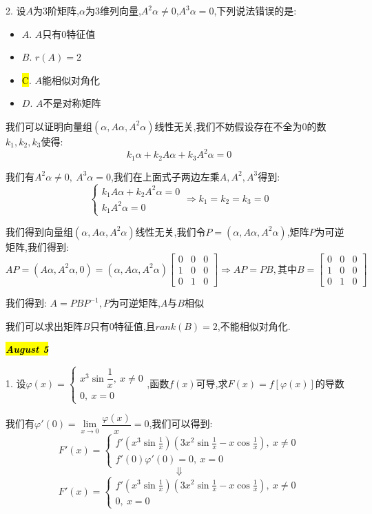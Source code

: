 2. 设$A$为$3$阶矩阵,$\alpha$为$3$维列向量,$A^2\alpha\neq 0$,$A^3\alpha=0$,下列说法错误的是:  
\begin{itemize}
	\item $A$. $A$只有$0$特征值
	\item $B$. $r(A)=2$
	\item \hl{C}. $A$能相似对角化
	\item $D$. $A$不是对称矩阵
\end{itemize}
\begin{solution}

	我们可以证明向量组$(\alpha,A\alpha,A^2\alpha)$线性无关,我们不妨假设存在不全为$0$的数$k_{1},k_{2},k_{3}$使得:  
	$$k_{1}\alpha+k_{2}A\alpha+k_{3}A^2\alpha=0$$
	
	我们有$A^2\alpha\neq 0,\ A^3\alpha=0$,我们在上面式子两边左乘$A,A^2,A^3$得到:  
	$$\left\lbrace
	\begin{array}{l}
		k_{1}A\alpha+k_{2}A^2\alpha=0\\
		k_{1}A^2\alpha=0
	\end{array}
	\right. \Rightarrow k_{1}=k_{2}=k_{3}=0$$
	
	我们得到向量组$(\alpha,A\alpha,A^2\alpha)$线性无关,我们令$P=(\alpha,A\alpha,A^2\alpha)$,矩阵$P$为可逆矩阵,我们得到:  
	$$AP=(A\alpha,A^2\alpha,0)=(\alpha,A\alpha,A^2\alpha)\left[ \begin{matrix}
		0&0&0\\1&0&0\\0&1&0
	\end{matrix}\right] \Rightarrow AP=PB,\text{其中}B=\left[ \begin{matrix}
	0&0&0\\1&0&0\\0&1&0
\end{matrix}\right] $$

我们得到:  $A=PBP^{-1},P\text{为可逆矩阵}$,$A$与$B$相似

我们可以求出矩阵$B$只有$0$特征值,且$rank(B)=2$,不能相似对角化.
\end{solution}

\hl{\textbf{\textit{August 5}}}

1. 设$\varphi(x)=\left\lbrace
\begin{array}{l}
	x^3\sin\dfrac{1}{x},\ x\neq 0\\
	0,\ x=0
\end{array}
\right. $,函数$f(x)$可导,求$F(x)=f[\varphi(x)]$的导数
\begin{solution}

	我们有$\varphi'(0)=\lim\limits_{x\rightarrow 0}\dfrac{\varphi(x)}{x}=0$,我们可以得到:  
	$$F'(x)=\left\lbrace
	\begin{array}{l}
		f'(x^3\sin\frac{1}{x})(3x^2\sin\frac{1}{x}-x\cos\frac{1}{x}),\ x\neq 0\\
		f'(0)\varphi'(0)=0,\ x=0
	\end{array}
	\right.$$
	$$\Downarrow$$ 
	$$ F'(x)=\left\lbrace
	\begin{array}{l}
		f'(x^3\sin\frac{1}{x})(3x^2\sin\frac{1}{x}-x\cos\frac{1}{x}),\ x\neq 0\\
		0,\ x=0
	\end{array}
	\right. $$
\end{solution}


